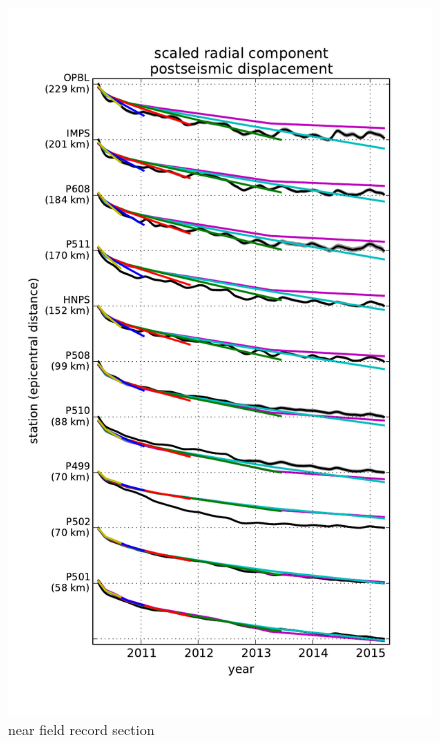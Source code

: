 \documentclass[12pt]{article}
\begin{document}
\begin{figure}
\includegraphics[scale=0.8]{Figures/near_field_record_section}
\centering 
\caption{near field record section}
\label{NearFieldRS}
\end{figure}
\end{document}
